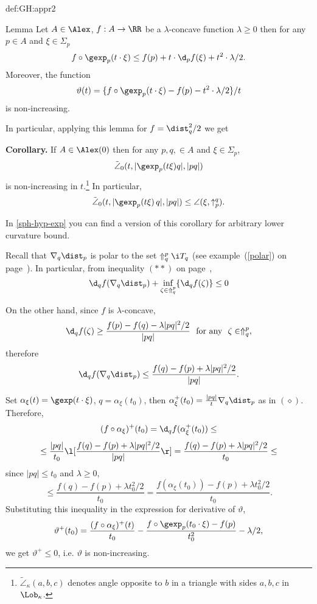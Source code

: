 {\begin{subthm}{def:GH:appr2}
\begin{thm}{Lemma} \label{lem:monotonic}
Let $A\in \Alex$,  $f:A\to\RR$ be a $\lambda$-concave function $\lambda\ge 0$ then for any $p\in A$ and $\xi\in \Sigma_p$
$$f\circ\gexp_p(t\cdot\xi)\le f(p)+t\cdot\d_p f(\xi)+t^2\cdot\lambda/2.$$
Moreover, the function
$$\vartheta(t)=\{f\circ\gexp_p(t\cdot\xi)-f(p)-t^2\cdot\lambda/2\}/t$$
is non-increasing.
\end{thm}

In particular, applying this lemma for $f=\dist_q^2/2$ we get

\begin{thm}{\bf Corollary.} \label{cor:angle--}
If $A\in\Alex(0)$ then for any $p,q,\in A$ and
$\xi\in \Sigma_p$,
$$\tilde\angle_0(t,|\gexp_p(t\xi)q|,|p q|)$$ 
is non-increasing in $t$.\footnote{$\tilde\angle_\kappa(a,b,c)$ denotes angle
opposite to $b$ in a triangle with sides $a,b,c$ in $\Lob_\kappa$.} In
particular,
$$\tilde\angle_{0}(t,|\gexp_p(t\xi)\,q|,|p q|) \le\angle(\xi,\uparrow_p^q).$$
\end{thm}

In \ref{sph-hyp-exp} you can find a version of this corollary for arbitrary lower curvature bound.

Recall that $\nabla_q\dist_p$ is polar to the set $\Uparrow_q^p\i T_q$ (see
example~(\ref{polar}) on page~\pageref{polar}). 
In particular, from inequality $(**)$ on page~\pageref{**-polar-inq},
$$\d_q f(\nabla_q\dist_p) 
+\inf_{\zeta\in\Uparrow_q^p}\{\d_q f(\zeta)\}
\le 0$$

On the other hand, since $f$ is $\lambda$-concave,
$$\d_q f(\zeta)\ge \frac{f(p)-f(q)-\lambda|p q|^2/2}{|p q|}\ \ \text{for any}\
\ \zeta\in \Uparrow_q^p,$$
therefore
$$\d_q f(\nabla_q\dist_p)
\le
\frac{f(q)-f(p)+\lambda|p q|^2/2}{|p q|}.$$

Set $\alpha_\xi(t)=\gexp(t\cdot\xi)$, $q=\alpha_\xi(t_0)$, then 
$\alpha^+_\xi(t_0)=\tfrac{|p q|}{t}\nabla_{q}\dist_p$ as in $(\diamond)$. 
Therefore,
$$(f\circ\alpha_\xi)^+(t_0)=
\d_q f(\alpha^+_\xi(t_0))\le$$
$$\le
\frac{|p q|}{t_0}\l[\frac{f(q)-f(p)+\lambda|p q|^2/2}{|p q|}\r]
=
\frac{f(q)-f(p)+\lambda|p q|^2/2}{t_0}\le$$
since $|p q|\le t_0$ and $\lambda\ge 0$,
$$\le \frac{f(q)-f(p)+\lambda t^2_0/2}{t_0}
=\frac{f(\alpha_\xi(t_0))-f(p)+\lambda t^2_0/2}{t_0}.$$
Substituting this inequality in the expression for derivative of $\vartheta$,
$$\vartheta^+(t_0)=\frac{(f\circ\alpha_\xi)^+(t)}{t_0}
-\frac{f\circ\gexp_p(t_0\cdot\xi)- f(p)}{t_0^2}-\lambda /2,$$ we get
$\vartheta^+\le 0$, i.e. $\vartheta$ is non-increasing. 


\end{subthm}}
